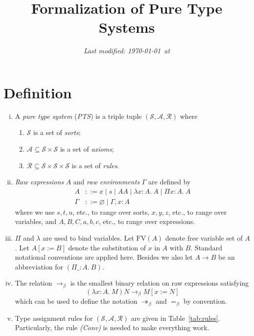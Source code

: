 \documentclass[oneside,a4paper]{article}
\title{\bf Formalization of Pure Type Systems}
\author{}
\date{\small \it Last modified: \today\ at \currenttime}
\numberwithin{equation}{section}
\begin{document}
\maketitle

\section{Definition}
\begin{enumerate}[(i)]
\item A \emph{pure type system} (\emph{PTS}) is a triple tuple
  $(\mathcal{S},\mathcal{A},\mathcal{R})$ where

  \begin{enumerate}
  \item $\mathcal{S}$ is a set of \emph{sorts};
  \item $\mathcal{A}\subseteq \mathcal{S} \times \mathcal{S}$ is a set
    of \emph{axioms};
  \item
    $\mathcal{R}\subseteq \mathcal{S} \times \mathcal{S} \times
    \mathcal{S}$ is a set of \emph{rules}.
  \end{enumerate}

\item \emph{Raw expressions} $A$ and \emph{raw environments} $\Gamma$
  are defined by
  \begin{align*}
    A &::= x \mid s \mid AA \mid \lambda x:A.\ A \mid \Pi x:A.\ A\\
    \Gamma &::= \varnothing \mid \Gamma,x:A
  \end{align*}
  where we use $s,t,u$, etc., to range over sorts, $x,y,z$, etc., to
  range over variables, and $A,B,C,a,b,c$, etc., to range over
  expressions.

\item $\Pi$ and $\lambda$ are used to bind variables. Let
  $\mathrm{FV}(A)$ denote free variable set of $A$. Let $A[x:=B]$
  denote the substitution of $x$ in $A$ with $B$. Standard notational
  conventions are applied here. Besides we also let $A \to B$ be an
  abbreviation for $(\Pi \_:A.\ B)$.

\item The relation $\to _ \beta$ is the smallest binary relation on
  raw expressions satisfying
  \[ (\lambda x:A.\ M)N \to _ \beta M[x:=N] \]
  which can be used to define the notation $\twoheadrightarrow_\beta$
  and $=_\beta$ by convention.

\item Type assignment rules for
  $(\mathcal{S},\mathcal{A},\mathcal{R})$ are given in
  Table~\ref{tab:rules}. Particularly, the rule \emph{(Conv)} is
  needed to make everything work.


\end{enumerate}
\end{document}

